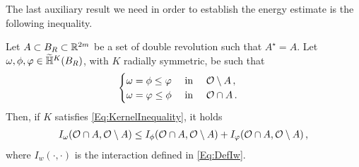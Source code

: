 The last auxiliary result we need in order to establish the energy estimate is the following inequality.

\begin{lemma}
\label{Lemma:InteractionInequalityMinimumFunction}
Let $A\subset B_R \subset \mathbb{R}^{2m}$ be a set of double revolution such that $A^\star = A$. Let $\omega, \phi, \varphi \in \widetilde{\mathbb{H}}^K(B_R)$, with $K$ radially symmetric, be such that
\begin{equation}
	\label{Eq:InteractionMinHyp}
	\begin{cases}
	\omega = \phi \leq \varphi \ \ \ \ \textrm{in } \ \ \ \mathcal{O} \setminus A\,,\\
	\omega = \varphi \leq \phi \ \ \ \ \textrm{in } \ \ \ \mathcal{O} \cap A\,.
	\end{cases}
\end{equation}
Then, if $K$ satisfies \eqref{Eq:KernelInequality}, it holds
\begin{align*}
I_\omega(\mathcal{O}\cap A, \mathcal{O} \setminus A) \leq I_\phi(\mathcal{O}\cap A, \mathcal{O} \setminus A) + I_\varphi(\mathcal{O}\cap A, \mathcal{O} \setminus A)\,,
\end{align*}
where $I_w(\cdot, \cdot)$ is the interaction defined in \eqref{Eq:DefIw}.
\end{lemma}

